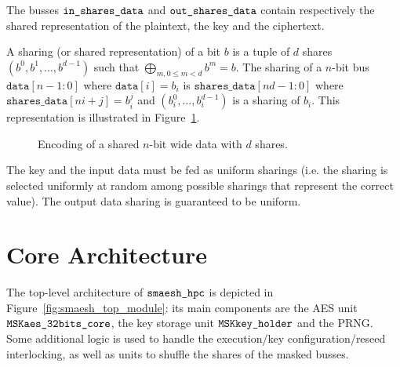 \documentclass{scrartcl}
\begin{document}
The busses $\texttt{in\_shares\_data}$ and
$\texttt{out\_shares\_data}$ contain respectively the shared representation of the
plaintext, the key and the ciphertext.

A sharing (or shared representation) of a bit $b$ is a tuple of $d$ shares
$\left(b^0, b^1, \dots, b^{d-1} \right)$ such that $\bigoplus_{m,0\leq m<d} b^m = b$.
The sharing of a $n$-bit bus
$\texttt{data}\left[ n-1:0\right]$ where $\texttt{data}[i]=b_i$
is
$\texttt{shares\_data}\left[ nd-1:0 \right]$ where
$\texttt{shares\_data}\left[ ni+j\right] = b_i^j$ and
$\left(b_i^0, \dots, b_i^{d-1}\right)$ is a sharing of $b_i$.
This representation is illustrated in Figure~\ref{fig:encoding}.

\begin{figure}
    \centering
    \resizebox{\textwidth}{!}{
        \begin{tikzpicture}
            
        \end{tikzpicture}
    }
    \caption{Encoding of a shared $n$-bit wide data with $d$ shares.}
    \label{fig:encoding}
\end{figure}

The key and the input data must be fed as uniform sharings (i.e. the sharing is
selected uniformly at random among possible sharings that represent the correct
value). The output data sharing is guaranteed to be uniform.

\section{Core Architecture}
\label{section:architecture}

The top-level architecture of $\texttt{smaesh\_hpc}$ is depicted in Figure~\ref{fig:smaesh_top_module}:
its main components are the AES unit $\texttt{MSKaes\_32bits\_core}$, the key storage unit $\texttt{MSKkey\_holder}$ and the PRNG. Some additional logic
is used to handle the execution/key configuration/reseed interlocking, as well as units to shuffle
the shares of the masked busses.
\end{document}
